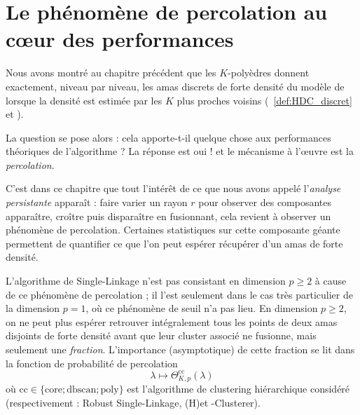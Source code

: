 \chapter{Le phénomène de percolation au c\oe{}ur des performances}
\label{sec:chap_percolation}

Nous avons montré au chapitre précédent que les $K$-polyèdres donnent exactement, niveau par niveau, les amas discrets de forte densité du modèle de  lorsque la densité est estimée par les $K$ plus proches voisins (\Def~\ref{def:HDC_discret} et ). 

La question se pose alors : cela apporte-t-il quelque chose aux performances théoriques de l'algorithme ?
La réponse est oui ! et le mécanisme à l'œuvre est la \emph{percolation}. 

C'est dans ce chapitre que tout l'intérêt de ce que nous avons appelé l'\emph{analyse persistante} apparaît : faire varier un rayon $r$ pour observer des composantes apparaître, croître puis disparaître en fusionnant, cela revient à observer un phénomène de percolation. Certaines statistiques sur cette composante géante permettent de quantifier ce que l'on peut espérer récupérer d'un amas de forte densité.

L'algorithme de Single-Linkage n'est pas consistant en dimension $p \ge 2$ à cause de ce phénomène de percolation ; il l'est seulement dans le cas très particulier de la dimension $p=1$, où ce phénomène de seuil n'a pas lieu. En dimension $p \ge 2$, on ne peut plus espérer retrouver intégralement tous les points de deux amas disjoints de forte densité avant que leur cluster associé ne fusionne, mais seulement une \emph{fraction}. L'importance (asymptotique) de cette fraction se lit dans la fonction de probabilité de percolation
\[
    \lambda\longmapsto \Theta^{\mathrm{cc}}_{K,p}(\lambda)
\]
où $\mathrm{cc} \in \bigl\{ \mathrm{core} ; \mathrm{dbscan} ; \mathrm{poly}\bigr\}$ est l'algorithme de clustering hiérarchique considéré (respectivement : Robust Single-Linkage, (H)\DBSCAN et \HGP-Clusterer).


